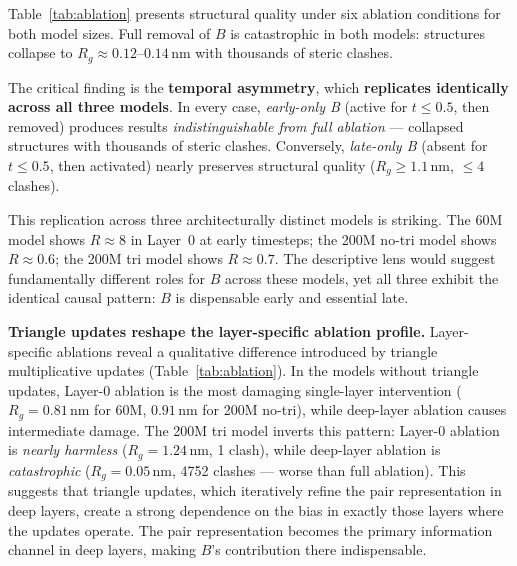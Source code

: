 \documentclass{article}
\begin{document}
Table~\ref{tab:ablation} presents structural quality under six ablation conditions for both model sizes.
Full removal of $B$ is catastrophic in both models: structures collapse to $R_g \approx 0.12$--$0.14$\,nm with thousands of steric clashes.

The critical finding is the \textbf{temporal asymmetry}, which \textbf{replicates identically across all three models}.
In every case, \emph{early-only B} (active for $t \leq 0.5$, then removed) produces results \emph{indistinguishable from full ablation} --- collapsed structures with thousands of steric clashes.
Conversely, \emph{late-only B} (absent for $t \leq 0.5$, then activated) nearly preserves structural quality ($R_g \geq 1.1$\,nm, $\leq 4$ clashes).

This replication across three architecturally distinct models is striking.
The 60M model shows $R \approx 8$ in Layer~0 at early timesteps; the 200M no-tri model shows $R \approx 0.6$; the 200M tri model shows $R \approx 0.7$.
The descriptive lens would suggest fundamentally different roles for $B$ across these models, yet all three exhibit the identical causal pattern: $B$ is dispensable early and essential late.

\textbf{Triangle updates reshape the layer-specific ablation profile.}
Layer-specific ablations reveal a qualitative difference introduced by triangle multiplicative updates (Table~\ref{tab:ablation}).
In the models without triangle updates, Layer-0 ablation is the most damaging single-layer intervention ($R_g = 0.81$\,nm for 60M, $0.91$\,nm for 200M no-tri), while deep-layer ablation causes intermediate damage.
The 200M tri model inverts this pattern: Layer-0 ablation is \emph{nearly harmless} ($R_g = 1.24$\,nm, 1 clash), while deep-layer ablation is \emph{catastrophic} ($R_g = 0.05$\,nm, 4752 clashes --- worse than full ablation).
This suggests that triangle updates, which iteratively refine the pair representation in deep layers, create a strong dependence on the bias in exactly those layers where the updates operate.
The pair representation becomes the primary information channel in deep layers, making $B$'s contribution there indispensable.
\end{document}
